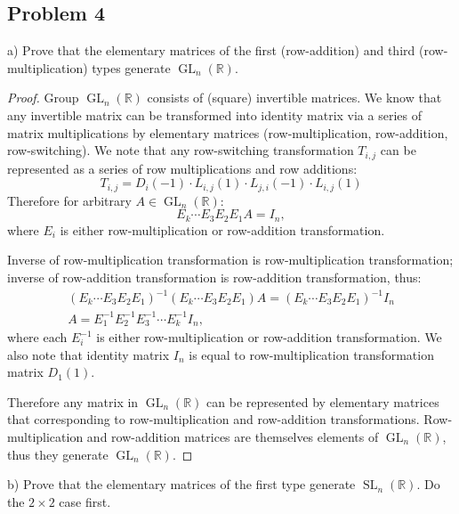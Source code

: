 \documentclass{article}
\newcommand{\R}{\mathbb{R}}
\newcommand{\GL}{\operatorname{GL}}
\newcommand{\SL}{\operatorname{SL}}
\newcommand{\GLnR}{\GL_n(\R)}
\newcommand{\SLnR}{\SL_n(\R)}
\begin{document}
\subsection*{Problem 4}

\begin{tcolorbox}
a) Prove that the elementary matrices of the first (row-addition) and third (row-multiplication) types generate $\GLnR$.
\end{tcolorbox}

\begin{proof}

Group $\GLnR$ consists of (square) invertible matrices.
We know that any invertible matrix can be transformed into identity matrix via a series of matrix multiplications by elementary matrices (row-multiplication, row-addition, row-switching). We note that any row-switching transformation $T_{i,j}$ can be represented as a series of row multiplications and row additions:
\[ T_{i,j} = D_i(-1) \cdot L_{i,j}(1) \cdot L_{j,i}(-1) \cdot L_{i,j}(1) \]
Therefore for arbitrary $A \in \GLnR$:
\[ E_k \cdots E_3 E_2 E_1 A = I_n, \]
where $E_i$ is either row-multiplication or row-addition transformation.

Inverse of row-multiplication transformation is row-multiplication transformation;
inverse of row-addition transformation is row-addition transformation, thus:
\begin{gather*}
    (E_k \cdots E_3 E_2 E_1)^{-1} (E_k \cdots E_3 E_2 E_1) A = (E_k \cdots E_3 E_2 E_1)^{-1} I_n \\
    A = E_1^{-1} E_2^{-1} E_3^{-1} \cdots E_k^{-1} I_n,
\end{gather*}
where each $E_i^{-1}$ is either row-multiplication or row-addition transformation.
We also note that identity matrix $I_n$ is equal to row-multiplication transformation matrix $D_1(1)$.

Therefore any matrix in $\GLnR$ can be represented by elementary matrices that corresponding to row-multiplication and row-addition transformations.
Row-multiplication and row-addition matrices are themselves elements of $\GLnR$, thus they generate $\GLnR$.

\end{proof}

\begin{tcolorbox}
b) Prove that the elementary matrices of the first type generate $\SLnR$.
Do the $2 \times 2$ case first.
\end{tcolorbox}
\end{document}
